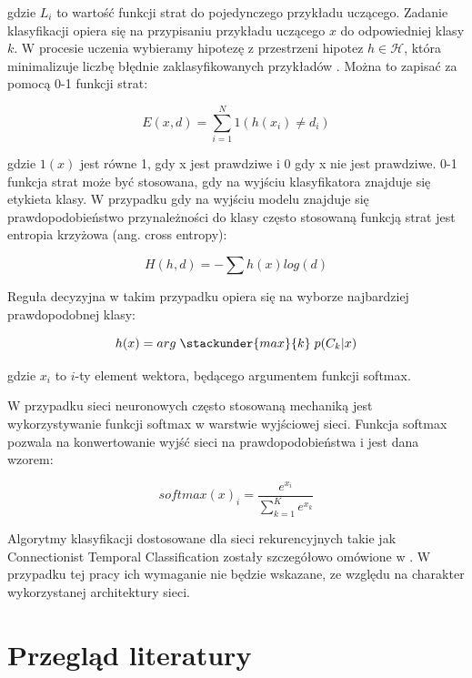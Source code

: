 \documentclass[oneside, mag]{mgr}
\begin{document}
gdzie $L_i$ to wartość funkcji strat do pojedynczego przykładu uczącego. Zadanie klasyfikacji opiera się na przypisaniu przykładu uczącego $x$ do odpowiedniej klasy $k$. W procesie uczenia wybieramy hipotezę z przestrzeni hipotez $h \in \mathcal{H}$, która minimalizuje liczbę błędnie zaklasyfikowanych przykładów \cite{introduction-to-machine-learning}. Można to zapisać za pomocą 0-1 funkcji strat:

\begin{equation}
	E(x, d) = \sum_{i=1}^N 1(h(x_i) \neq d_i )
\end{equation}

gdzie $1(x)$ jest równe 1, gdy x jest prawdziwe i 0 gdy x nie jest prawdziwe. 0-1 funkcja strat może być stosowana, gdy na wyjściu klasyfikatora znajduje się etykieta klasy. W przypadku gdy na wyjściu modelu znajduje się prawdopodobieństwo przynależności do klasy często stosowaną funkcją strat jest entropia krzyżowa (ang. cross entropy):

\begin{equation}
	H(h,d) = - \sum h(x) log(d)
\end{equation}

Reguła decyzyjna w takim przypadku opiera się na wyborze najbardziej prawdopodobnej klasy:

\begin{equation}
	h(x) = arg \; \stackunder{max}{k} \; p(C_k | x)
\end{equation}

gdzie $x_i$ to $i$-ty element wektora, będącego argumentem funkcji softmax.

W przypadku sieci neuronowych często stosowaną mechaniką jest wykorzystywanie funkcji softmax w warstwie wyjściowej sieci. Funkcja softmax pozwala na konwertowanie wyjść sieci na prawdopodobieństwa i jest dana wzorem:

\begin{equation}
	softmax(x)_i = \frac{e^{x_i}}{\sum_{k=1}^{K} e^{x_k}}
\end{equation}

Algorytmy klasyfikacji dostosowane dla sieci rekurencyjnych takie jak Connectionist Temporal
Classification zostały szczegółowo omówione w \cite{graves-phd}. W przypadku tej pracy ich wymaganie nie będzie wskazane, ze względu na charakter wykorzystanej architektury sieci.

\section{Przegląd literatury}
\end{document}
